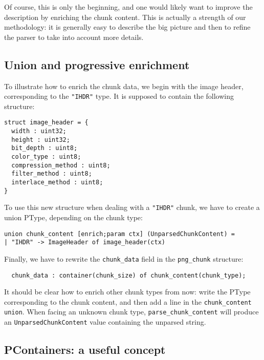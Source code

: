 \documentclass[conference]{IEEEtran}
\begin{document}
Of course, this is only the beginning, and one would likely want to
improve the description by enriching the chunk content. This is
actually a strength of our methodology: it is generally easy to
describe the big picture and then to refine the parser to take into
account more details.


\subsection{Union and progressive enrichment}

To illustrate how to enrich the chunk data, we begin with the image
header, corresponding to the \texttt{"IHDR"} type. It is supposed to
contain the following structure:
\begin{lstlisting}
struct image_header = {
  width : uint32;
  height : uint32;
  bit_depth : uint8;
  color_type : uint8;
  compression_method : uint8;
  filter_method : uint8;
  interlace_method : uint8;
}
\end{lstlisting}

To use this new structure when dealing with a \texttt{"IHDR"} chunk,
we have to create a union PType, depending on the chunk type:
\begin{lstlisting}
union chunk_content [enrich;param ctx] (UnparsedChunkContent) =
| "IHDR" -> ImageHeader of image_header(ctx)
\end{lstlisting}

Finally, we have to rewrite the \texttt{chunk\_data} field in the
\texttt{png\_chunk} structure:
\begin{lstlisting}
  chunk_data : container(chunk_size) of chunk_content(chunk_type);
\end{lstlisting}

It should be clear how to enrich other chunk types from now: write the
PType corresponding to the chunk content, and then add a line in the
\texttt{chunk\_content} \texttt{union}. When facing an unknown chunk
type, \texttt{parse\_chunk\_content} will produce an
\texttt{UnparsedChunkContent} value containing the unparsed string.


\subsection{PContainers: a useful concept}
\end{document}
